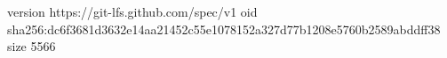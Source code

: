 version https://git-lfs.github.com/spec/v1
oid sha256:dc6f3681d3632e14aa21452c55e1078152a327d77b1208e5760b2589abddff38
size 5566
